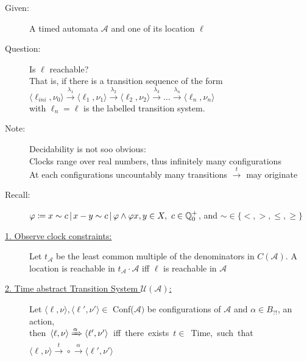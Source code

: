 \begin{tcolorbox}[colback=kapiteleins!5!white, colframe=orange!75!black, title=\textbf{Location Reachability / The Region Automata}, left=0mm, right=0mm, top=0mm, bottom=0mm]
\begin{description}
\item[Given:] A timed automata $\mathcal{A}$ and one of its location $\ell$
\item[Question:] Is $\ell$ reachable?\\That is, if there is a transition sequence of the form\\$\langle \ell_{ini}, \nu_0 \rangle \xrightarrow{\lambda_1} \langle \ell_1, \nu_1 \rangle \xrightarrow{\lambda_2} \langle \ell_2, \nu_2 \rangle \xrightarrow{\lambda_3} \ldots \xrightarrow{\lambda_n} \langle \ell_n, \nu_n \rangle$\\[0.1cm]
with $\ell_n = \ell$ is the labelled transition system.\\

\item[Note:] Decidability is not soo obvious:\\
Clocks range over real numbers, thus infinitely many configurations\\
At each configurations uncountably many transitions $\xrightarrow{t}$ may originate\\

\item[Recall:] $\varphi \coloneqq x \sim c \, \vert \, x-y \sim c \, \vert \, \varphi \land \varphi \hfill x,y \in X, ~ c \in \mathbb{Q}_0^+$, and $\sim \in \{<,>, \leq, \geq\}$\\

\item[\uline{1. Observe clock constraints:}] Let $t_{\mathcal{A}}$ be the least common multiple of the denominators in $C(\mathcal{A})$.
A location is reachable in $t_{\mathcal{A}} \cdot \mathcal{A}$ \hfill iff $\ell$ is reachable in $\mathcal{A}$\\

\item[\uline{2. Time abstract Transition System $\mathcal{U}(\mathcal{A})$:}] \hfill \newline
Let $\langle \ell, \nu \rangle, \langle \ell', \nu' \rangle \in$ Conf($\mathcal{A})$ be configurations of $\mathcal{A}$ and $\alpha \in B_{?!}$, an action,\\
\mbox{then $\langle \ell, \nu \rangle \xRightarrow{\alpha} \langle \ell', \nu' \rangle$ iff there exists $t \in$ Time, such that $\langle \ell, \nu \rangle \xrightarrow{t} \circ \xrightarrow{\alpha} \langle \ell', \nu' \rangle$}\\


\end{description}
\end{tcolorbox}
